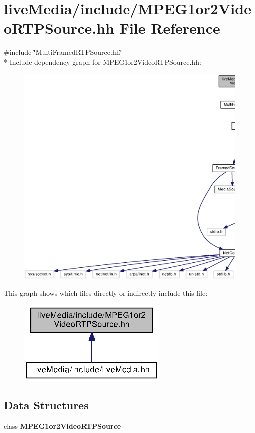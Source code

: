 \section{live\+Media/include/\+M\+P\+E\+G1or2\+Video\+R\+T\+P\+Source.hh File Reference}
\label{MPEG1or2VideoRTPSource_8hh}
{\ttfamily \#include \char`\"{}Multi\+Framed\+R\+T\+P\+Source.\+hh\char`\"{}}\\*
Include dependency graph for M\+P\+E\+G1or2\+Video\+R\+T\+P\+Source.\+hh\+:
\nopagebreak
\begin{figure}[H]
\begin{center}
\leavevmode
\includegraphics[width=350pt]{MPEG1or2VideoRTPSource_8hh__incl}
\end{center}
\end{figure}
This graph shows which files directly or indirectly include this file\+:
\nopagebreak
\begin{figure}[H]
\begin{center}
\leavevmode
\includegraphics[width=204pt]{MPEG1or2VideoRTPSource_8hh__dep__incl}
\end{center}
\end{figure}
\subsection*{Data Structures}
\begin{DoxyCompactItemize}
\item 
class {\bf M\+P\+E\+G1or2\+Video\+R\+T\+P\+Source}
\end{DoxyCompactItemize}
